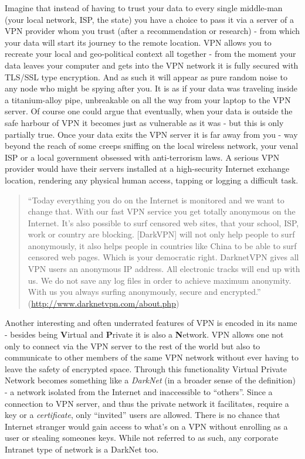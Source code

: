Imagine that instead of having to trust your data to every single
middle-man (your local network, ISP, the state) you have a choice to
pass it via a server of a VPN provider whom you trust (after a
recommendation or research) - from which your data will start its
journey to the remote location. VPN allows you to recreate your local
and geo-political context all together - from the moment your data
leaves your computer and gets into the VPN network it is fully secured
with TLS/SSL type encryption. And as such it will appear as pure random
noise to any node who might be spying after you. It is as if your data
was traveling inside a titanium-alloy pipe, unbreakable on all the way
from your laptop to the VPN server. Of course one could argue that
eventually, when your data is outside the safe harbour of VPN it becomes
just as vulnerable as it was - but this is only partially true. Once
your data exits the VPN server it is far away from you - way beyond the
reach of some creeps sniffing on the local wireless network, your venal
ISP or a local government obsessed with anti-terrorism laws. A serious
VPN provider would have their servers installed at a high-security
Internet exchange location, rendering any physical human access, tapping
or logging a difficult task.

\begin{quote}
``Today everything you do on the Internet is monitored and we want to
change that. With our fast VPN service you get totally anonymous on the
Internet. It's also possible to surf censored web sites, that your
school, ISP, work or country are blocking. {[}DarkVPN{]} will not only
help people to surf anonymously, it also helps people in countries like
China to be able to surf censored web pages. Which is your democratic
right. DarknetVPN gives all VPN users an anonymous IP address. All
electronic tracks will end up with us. We do not save any log files in
order to achieve maximum anonymity. With us you always surfing
anonymously, secure and encrypted.''
(\href{http://www.darknetvpn.com/about.php}{http://www.darknetvpn.com/about.php})

\end{quote}
Another interesting and often underrated features of VPN is encoded in
its name - besides being \textbf{V}irtual and \textbf{P}rivate it is
also a \textbf{N}etwork. VPN allows one not only to connect via the VPN
server to the rest of the world but also to communicate to other members
of the same VPN network without ever having to leave the safety of
encrypted space. Through this functionality Virtual Private Network
becomes something like a \emph{DarkNet} (in a broader sense of the
definition) - a network isolated from the Internet and inaccessible to
``others''. Since a connection to VPN server, and thus the private
network it facilitates, require a key or a \emph{certificate}, only
``invited'' users are allowed. There is no chance that Internet stranger
would gain access to what's on a VPN without enrolling as a user or
stealing someones keys. While not referred to as such, any corporate
Intranet type of network is a DarkNet too.

